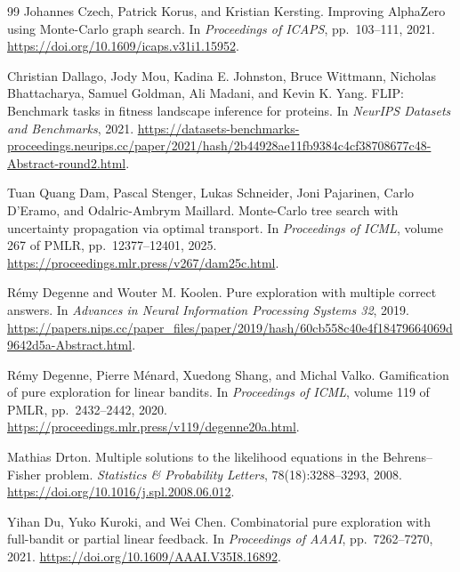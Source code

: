 \documentclass{article}
\theoremstyle{plain}
\theoremstyle{definition}
\begin{document}
\begin{thebibliography}{99}
Johannes Czech, Patrick Korus, and Kristian Kersting.
Improving AlphaZero using Monte-Carlo graph search.
In \emph{Proceedings of ICAPS}, pp.\ 103--111, 2021.
\url{https://doi.org/10.1609/icaps.v31i1.15952}.

Christian Dallago, Jody Mou, Kadina E. Johnston, Bruce Wittmann, Nicholas Bhattacharya, Samuel Goldman, Ali Madani, and Kevin K. Yang.
FLIP: Benchmark tasks in fitness landscape inference for proteins.
In \emph{NeurIPS Datasets and Benchmarks}, 2021.
\url{https://datasets-benchmarks-proceedings.neurips.cc/paper/2021/hash/2b44928ae11fb9384c4cf38708677c48-Abstract-round2.html}.

Tuan Quang Dam, Pascal Stenger, Lukas Schneider, Joni Pajarinen, Carlo D'Eramo, and Odalric-Ambrym Maillard.
Monte-Carlo tree search with uncertainty propagation via optimal transport.
In \emph{Proceedings of ICML}, volume 267 of PMLR, pp.\ 12377--12401, 2025.
\url{https://proceedings.mlr.press/v267/dam25c.html}.

R\'emy Degenne and Wouter M. Koolen.
Pure exploration with multiple correct answers.
In \emph{Advances in Neural Information Processing Systems 32}, 2019.
\url{https://papers.nips.cc/paper_files/paper/2019/hash/60cb558c40e4f18479664069d9642d5a-Abstract.html}.

R\'emy Degenne, Pierre M\'enard, Xuedong Shang, and Michal Valko.
Gamification of pure exploration for linear bandits.
In \emph{Proceedings of ICML}, volume 119 of PMLR, pp.\ 2432--2442, 2020.
\url{https://proceedings.mlr.press/v119/degenne20a.html}.

Mathias Drton.
Multiple solutions to the likelihood equations in the Behrens--Fisher problem.
\emph{Statistics \& Probability Letters}, 78(18):3288--3293, 2008.
\url{https://doi.org/10.1016/j.spl.2008.06.012}.

Yihan Du, Yuko Kuroki, and Wei Chen.
Combinatorial pure exploration with full-bandit or partial linear feedback.
In \emph{Proceedings of AAAI}, pp.\ 7262--7270, 2021.
\url{https://doi.org/10.1609/AAAI.V35I8.16892}.


\end{thebibliography}
\end{document}
